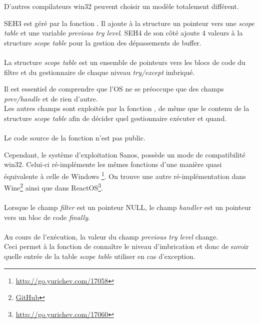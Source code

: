D'autres compilateurs win32 peuvent choisir un modèle totalement différent.


SEH3 est géré par la fonction . Il ajoute à la structure 
un pointeur vers une \emph{scope table} et une variable \emph{previous try level}.
SEH4 de son côté ajoute 4 valeurs à la structure \emph{scope table} pour la gestion des dépassements
de buffer.\\
\\
La structure \emph{scope table} est un ensemble de pointeurs vers les blocs de code du filtre et du
gestionnaire de chaque niveau \emph{try/except} imbriqué.



Il est essentiel de comprendre que l'\ac{OS} ne se préoccupe que des champs \emph{prev/handle} et de
rien d'autre.\\
Les autres champs sont exploités par la fonction , de même que le contenu
de la structure \emph{scope table} afin de décider quel gestionnaire exécuter et quand.\\
\\
Le code source de la fonction  n'est pas public.

Cependant, le système d'exploitation Sanos, possède un mode de compatibilité win32.
Celui-ci ré-implémente les mêmes fonctions d'une manière quasi équivalente à celle de Windows
\footnote{\url{http://go.yurichev.com/17058}}.
On trouve une autre ré-implémentation dans Wine\footnote{\href{http://go.yurichev.com/17059}{GitHub}}
ainsi que dans ReactOS\footnote{\url{http://go.yurichev.com/17060}}.\\
\\
Lorsque le champ \emph{filter} est un pointeur NULL, le champ \emph{handler} est un pointeur vers un
bloc de code \emph{finally}.\\
\\
Au cours de l'exécution, la valeur du champ \emph{previous try level} change. \\
Ceci permet à la
fonction  de connaître le niveau d'imbrication et donc de savoir quelle
entrée de la table \emph{scope table} utiliser en cas d'exception.




